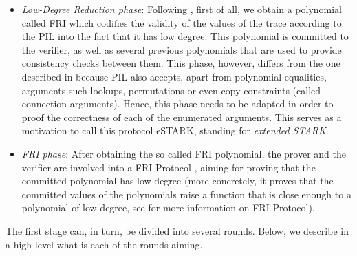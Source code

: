 \begin{itemize}
\item \textit{Low-Degree Reduction phase}: Following \cite{EPRINT:StarkWare21}, first of all, we obtain a polynomial called FRI which codifies the validity of the values of the trace according to the PIL into the fact that it has low degree. This polynomial is committed to the verifier, as well as several previous polynomials that are used to provide consistency checks between them.  This phase, however, differs from the one described in \cite{EPRINT:StarkWare21} because PIL also accepts, apart from polynomial equalities, arguments such lookups, permutations or even copy-constraints (called connection arguments). Hence, this phase needs to be adapted in order to proof the correctness of each of the enumerated arguments. This serves as a motivation to call this protocol \textsf{eSTARK}, standing for \textit{extended STARK}. 

\item \textit{FRI phase}: After obtaining the so called FRI polynomial, the prover and the verifier are involved into a FRI Protocol \cite{ICALP:BBHR18}, aiming for proving that the committed polynomial has low degree (more concretely, it proves that the committed values of the polynomials raise a function that is close enough to a polynomial of low degree, see \cite{ICALP:BBHR18} for more information on FRI Protocol). 
\end{itemize}

The first stage can, in turn, be divided into several rounds. Below, we describe in a high level what is each of the rounds aiming.

